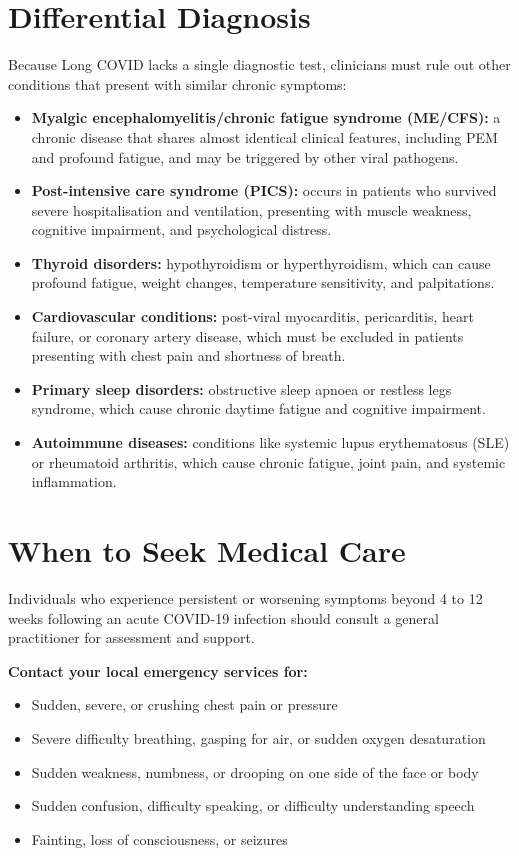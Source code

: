 \section*{Differential Diagnosis}
Because Long COVID lacks a single diagnostic test, clinicians must rule out other conditions that present with similar chronic symptoms:
\begin{itemize}
    \item \textbf{Myalgic encephalomyelitis/chronic fatigue syndrome (ME/CFS):} a chronic disease that shares almost identical clinical features, including PEM and profound fatigue, and may be triggered by other viral pathogens.
    \item \textbf{Post-intensive care syndrome (PICS):} occurs in patients who survived severe hospitalisation and ventilation, presenting with muscle weakness, cognitive impairment, and psychological distress.
    \item \textbf{Thyroid disorders:} hypothyroidism or hyperthyroidism, which can cause profound fatigue, weight changes, temperature sensitivity, and palpitations.
    \item \textbf{Cardiovascular conditions:} post-viral myocarditis, pericarditis, heart failure, or coronary artery disease, which must be excluded in patients presenting with chest pain and shortness of breath.
    \item \textbf{Primary sleep disorders:} obstructive sleep apnoea or restless legs syndrome, which cause chronic daytime fatigue and cognitive impairment.
    \item \textbf{Autoimmune diseases:} conditions like systemic lupus erythematosus (SLE) or rheumatoid arthritis, which cause chronic fatigue, joint pain, and systemic inflammation.
\end{itemize}

\section*{When to Seek Medical Care}
Individuals who experience persistent or worsening symptoms beyond 4 to 12 weeks following an acute COVID-19 infection should consult a general practitioner for assessment and support.

\textbf{Contact your local emergency services for:}
\begin{itemize}
    \item Sudden, severe, or crushing chest pain or pressure
    \item Severe difficulty breathing, gasping for air, or sudden oxygen desaturation
    \item Sudden weakness, numbness, or drooping on one side of the face or body
    \item Sudden confusion, difficulty speaking, or difficulty understanding speech
    \item Fainting, loss of consciousness, or seizures
\end{itemize}


